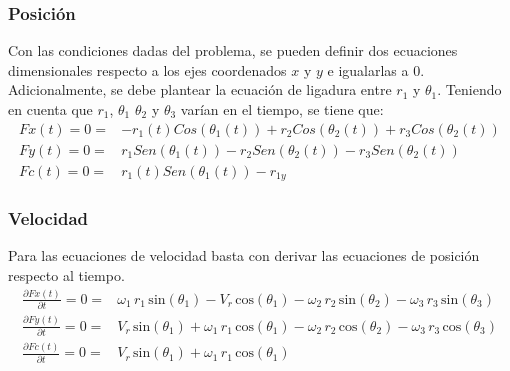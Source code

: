 \documentclass[12pt]{article}
\begin{document}
\subsubsection{Posición}
Con las condiciones dadas del problema, se pueden definir dos ecuaciones dimensionales respecto a los ejes coordenados $x$ y $y$ e igualarlas a 0. Adicionalmente, se debe plantear la ecuación de ligadura entre $r_1$ y $\theta_1$. Teniendo en cuenta que $r_1$, $\theta_1$ $\theta_2$ y $\theta_3$ varían en el tiempo, se tiene que:
\footnotesize
\begin{align}
        Fx(t)=0=&-r_1(t)Cos(\theta_1(t))+r_2Cos(\theta_2(t))+r_3Cos(\theta_2(t))
    \label{pos x}\\
        Fy(t)=0=&r_1Sen(\theta_1(t))-r_2Sen(\theta_2(t))-r_3Sen(\theta_2(t))
    \label{pos y}\\
        Fc(t)=0=&r_1(t)Sen(\theta_1(t))-r_{1y}
    \label{pos lig}
\end{align}
\normalsize
\subsubsection{Velocidad}
Para las ecuaciones de velocidad basta con derivar las ecuaciones de posición respecto al tiempo.
\footnotesize
\begin{align}
        \frac{\partial Fx(t)}{\partial t}=0=&\omega_1 \,r_1 \,\mathrm{sin}\left(\theta_1 \right)-V_r \,\mathrm{cos}\left(\theta_1 \right)-\omega_2 \,r_2 \,\mathrm{sin}\left(\theta_2 \right)-\omega_3 \,r_3 \,\mathrm{sin}\left(\theta_3 \right)
    \label{vel x}\\
        \frac{\partial Fy(t)}{\partial t}=0=&V_r \,\mathrm{sin}\left(\theta_1 \right)+\omega_1 \,r_1 \,\mathrm{cos}\left(\theta_1 \right)-\omega_2 \,r_2 \,\mathrm{cos}\left(\theta_2 \right)-\omega_3 \,r_3 \,\mathrm{cos}\left(\theta_3 \right)
    \label{vel y}\\
        \frac{\partial Fc(t)}{\partial t}=0=&V_r \,\mathrm{sin}\left(\theta_1 \right)+\omega_1 \,r_1 \,\mathrm{cos}\left(\theta_1 \right)
    \label{vel lig}
\end{align}
\normalsize
\end{document}
